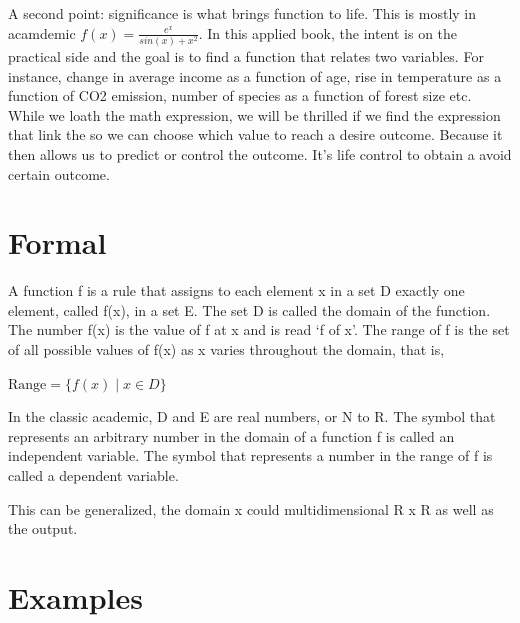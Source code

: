 \documentclass[
  letterpaper,
  DIV=11,
  numbers=noendperiod]{scrreprt}
\begin{document}
A second point: significance is what brings function to life. This is
mostly in acamdemic \(f(x) = \frac{e^x}{sin(x) + x^2}\). In this applied
book, the intent is on the practical side and the goal is to find a
function that relates two variables. For instance, change in average
income as a function of age, rise in temperature as a function of CO2
emission, number of species as a function of forest size etc. While we
loath the math expression, we will be thrilled if we find the expression
that link the so we can choose which value to reach a desire outcome.
Because it then allows us to predict or control the outcome. It's life
control to obtain a avoid certain outcome.

\section*{Formal}\label{formal-7}


A function f is a rule that assigns to each element x in a set D exactly
one element, called f(x), in a set E. The set D is called the domain of
the function. The number f(x) is the value of f at x and is read `f of
x'. The range of f is the set of all possible values of f(x) as x varies
throughout the domain, that is,

\(\text{Range} = \{f(x) \mid x \in D\}\)

In the classic academic, D and E are real numbers, or N to R. The symbol
that represents an arbitrary number in the domain of a function f is
called an independent variable. The symbol that represents a number in
the range of f is called a dependent variable.

This can be generalized, the domain x could multidimensional R x R as
well as the output.

\section*{Examples}\label{examples-7}

\end{document}
